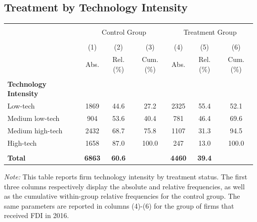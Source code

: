 \documentclass[a4paper,11pt]{scrartcl}
\begin{document}
\setcounter{figure}{0}
\subsection{Treatment by Technology Intensity}
\label{app:tech}

\begin{table}[htbp]
	\centering

\begin{threeparttable}

\begin{tabular}{lcccccc} 
\hline
\hline \\[-0.8em]
 & \multicolumn{3}{c}{Control Group} & \multicolumn{3}{c}{Treatment Group} \\ \cline{2-7} \\[-0.8em]
 & (1) & (2) & (3) & (4) & (5) & (6) \\
 & Abs. & Rel.(\%) & Cum.(\%)  & Abs. & Rel.(\%) & Cum.(\%)\\
\hline \\[-0.8em]
\textbf{Technology Intensity} & & & & & \\
Low-tech &1869&44.6&27.2&2325&55.4&52.1 \\
Medium low-tech &904&53.6&40.4&781&46.4&69.6 \\
Medium high-tech &2432&68.7&75.8&1107&31.3&94.5 \\
High-tech &1658&87.0&100.0&247&13.0&100.0 \\ \\[-0.8em]
\textbf{Total}&\textbf{6863}&\textbf{60.6}&&\textbf{4460}&\textbf{39.4}& \\
\hline
\hline
\end{tabular}
\begin{tablenotes}[flushleft]
\footnotesize
\item\textit{Note:} This table reports firm technology intensity by treatment status. The first three columns respectively display the absolute and relative frequencies, as well as the cumulative within-group relative frequencies for the control group. The same parameters are reported in columns (4)-(6) for the group of firms that received FDI in 2016. 


\end{tablenotes}
\end{threeparttable}
\end{table}
\newpage
\end{document}
